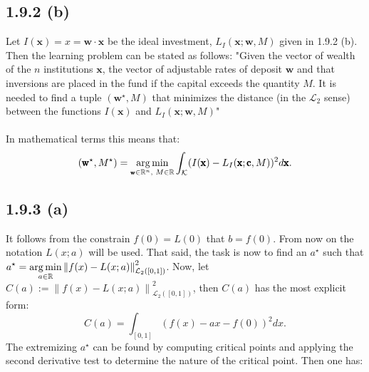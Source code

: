 \documentclass{exam}
\DeclareMathOperator*{\argmin}{arg\,min}
\begin{document}
\subsection*{1.9.2 (b)}
Let $I(\pmb{\text{x}}) = x = \pmb{\text{w}} \cdot \pmb{\text{x}}$ be the ideal investment, $L_{I}(\pmb{\text{x}};\pmb{\text{w}},M)$ given in 1.9.2 (b). Then the learning problem 
can be stated as follows: "Given the vector of wealth of the $n$ institutions $\pmb{\text{x}}$, the vector of adjustable rates of deposit $\pmb{\text{w}}$ and that inversions are placed 
in the fund if the capital exceeds the quantity $M$. It is needed to find a tuple $(\pmb{\text{w}}^\star,M)$ that minimizes the distance (in the $\mathcal{L}_2$ sense) between the functions
$I(\pmb{\text{x}})$ and $L_{I}(\pmb{\text{x}};\pmb{\text{w}},M)$" \\
\\
In mathematical terms this means that: \begin{equation*} 
    (\pmb{\text{w}}^\star,M^\star) = \argmin_{\tiny\pmb{\text{w}} \in \mathbb{R}^n \text{, } M \in \mathbb{R}} \displaystyle \int_{\mathcal{K}} (I(\pmb{\text{x}}) - L_{I}(\pmb{\text{x}};\pmb{\text{c}},M))^2 d \pmb{\text{x}}.
\end{equation*} 

\subsection*{1.9.3 (a)}
It follows from the constrain $f(0) = L(0)$ that $b = f(0)$. From now on the notation $L(x;a)$ will be used. That said, the task is now to find an $a^\star$ such that\\
$\displaystyle a^\star = \argmin_{ \tiny a \in \mathbb{R}} {\lVert f(x) - L(x;a) \rVert}^2_{\mathcal{L}_2([0,1])}$. Now, let $C(a) := {\lVert f(x) - L(x;a) \rVert}^2_{\mathcal{L}_2([0,1])}$, then $C(a)$ has the most explicit form: 
\begin{equation*}
    C(a) = \displaystyle \int_{[0,1]} (f(x) - ax -f(0))^2 d x.
\end{equation*}
The extremizing $a^\star$ can be found by computing critical points and applying the second derivative test to determine the nature of the critical point. Then one has: \\
\end{document}
